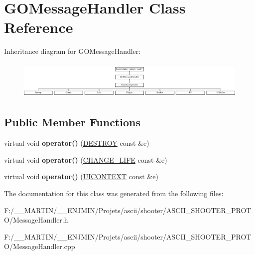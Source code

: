 \hypertarget{class_g_o_message_handler}{}\section{G\+O\+Message\+Handler Class Reference}
\label{class_g_o_message_handler}
Inheritance diagram for G\+O\+Message\+Handler\+:\begin{figure}[H]
\begin{center}
\leavevmode
\includegraphics[height=1.839080cm]{class_g_o_message_handler}
\end{center}
\end{figure}
\subsection*{Public Member Functions}
\begin{DoxyCompactItemize}
\item 
\hypertarget{class_g_o_message_handler_a56185d82155d3917c046327978872668}{}\label{class_g_o_message_handler_a56185d82155d3917c046327978872668} 
virtual void {\bfseries operator()} (\hyperlink{struct_d_e_s_t_r_o_y}{D\+E\+S\+T\+R\+OY} const \&e)
\item 
\hypertarget{class_g_o_message_handler_a2fd424c1de0a2a7ed1b8d14f36a3fd57}{}\label{class_g_o_message_handler_a2fd424c1de0a2a7ed1b8d14f36a3fd57} 
virtual void {\bfseries operator()} (\hyperlink{struct_c_h_a_n_g_e___l_i_f_e}{C\+H\+A\+N\+G\+E\+\_\+\+L\+I\+FE} const \&e)
\item 
\hypertarget{class_g_o_message_handler_abb5fd98aec67539124ba38a95f0f3ef1}{}\label{class_g_o_message_handler_abb5fd98aec67539124ba38a95f0f3ef1} 
virtual void {\bfseries operator()} (\hyperlink{struct_u_i_c_o_n_t_e_x_t}{U\+I\+C\+O\+N\+T\+E\+XT} const \&e)
\end{DoxyCompactItemize}


The documentation for this class was generated from the following files\+:\begin{DoxyCompactItemize}
\item 
F\+:/\+\_\+\+\_\+\+M\+A\+R\+T\+I\+N/\+\_\+\+\_\+\+E\+N\+J\+M\+I\+N/\+Projets/ascii/shooter/\+A\+S\+C\+I\+I\+\_\+\+S\+H\+O\+O\+T\+E\+R\+\_\+\+P\+R\+O\+T\+O/Message\+Handler.\+h\item 
F\+:/\+\_\+\+\_\+\+M\+A\+R\+T\+I\+N/\+\_\+\+\_\+\+E\+N\+J\+M\+I\+N/\+Projets/ascii/shooter/\+A\+S\+C\+I\+I\+\_\+\+S\+H\+O\+O\+T\+E\+R\+\_\+\+P\+R\+O\+T\+O/Message\+Handler.\+cpp\end{DoxyCompactItemize}

